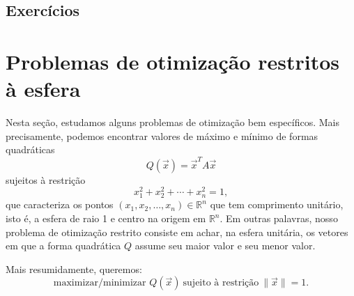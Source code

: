 \construirExeresol

\subsection*{Exercícios}

\construirExer

\section{Problemas de otimização restritos à esfera}

Nesta seção, estudamos alguns problemas de otimização bem específicos. Mais precisamente, podemos encontrar valores de máximo e mínimo de formas quadráticas
\begin{equation}
Q(\vec{x}) = \vec{x}^T A \vec{x}
\end{equation} sujeitos à restrição
\begin{equation}
x_1^2 + x_2^2 + \cdots + x_n^2 = 1,
\end{equation} que caracteriza os pontos $(x_1, x_2, \dots, x_n) \in \mathbb{R}^n$ que tem comprimento unitário, isto é, a esfera de raio 1 e centro na origem em $\mathbb{R}^n$. Em outras palavras, nosso problema de otimização restrito consiste em achar, na esfera unitária, os vetores em que a forma quadrática $Q$ assume seu maior valor e seu menor valor.

Mais resumidamente, queremos:
\begin{equation}
\text{maximizar/minimizar } Q(\vec{x}) \ \text{sujeito à restrição} \ \|\vec{x}\|=1.
\end{equation}

